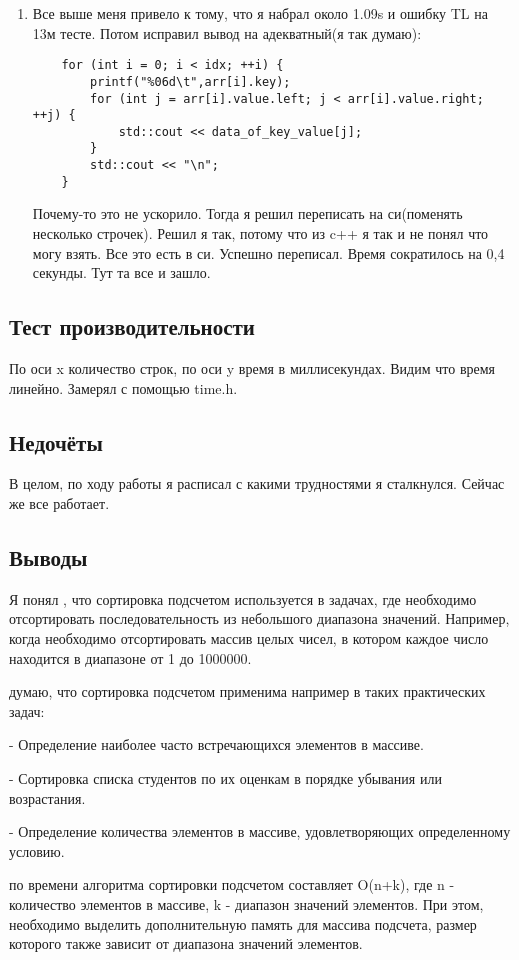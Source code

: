 \documentclass[12pt]{article}
\begin{document}
\begin{enumerate}
    \item Все выше меня привело к тому, что я набрал около 1.09s и ошибку TL на 13м тесте. Потом исправил вывод на адекватный(я так думаю):
\begin{lstlisting}
    for (int i = 0; i < idx; ++i) {
        printf("%06d\t",arr[i].key);
        for (int j = arr[i].value.left; j < arr[i].value.right; ++j) {
            std::cout << data_of_key_value[j];
        }
        std::cout << "\n";
    }
\end{lstlisting}
Почему-то это не ускорило. Тогда я решил переписать на си(поменять несколько строчек). Решил я так, потому что из c++ я так и не понял что могу взять. Все это есть в си. Успешно переписал. Время сократилось на 0,4 секунды. Тут та все и зашло.
\end{enumerate}

\subsection*{Тест производительности}

По оси x количество строк, по оси y время в миллисекундах. Видим что время линейно. Замерял с помощью time.h. 




\subsection*{Недочёты}

В целом, по ходу работы я расписал с какими трудностями я сталкнулся. Сейчас же все работает. 

\subsection*{Выводы}

Я понял , что сортировка подсчетом используется в задачах, где необходимо отсортировать последовательность из небольшого диапазона значений. Например, когда необходимо отсортировать массив целых чисел, в котором каждое число находится в диапазоне от 1 до 1000000.

 думаю, что сортировка подсчетом применима например в таких практических задач:

- Определение наиболее часто встречающихся элементов в массиве.

- Сортировка списка студентов по их оценкам в порядке убывания или возрастания.

- Определение количества элементов в массиве, удовлетворяющих определенному условию.

 по времени алгоритма сортировки подсчетом составляет O(n+k), где n - количество элементов в массиве, k - диапазон значений элементов. При этом, необходимо выделить дополнительную память для массива подсчета, размер которого также зависит от диапазона значений элементов.
\end{document}
